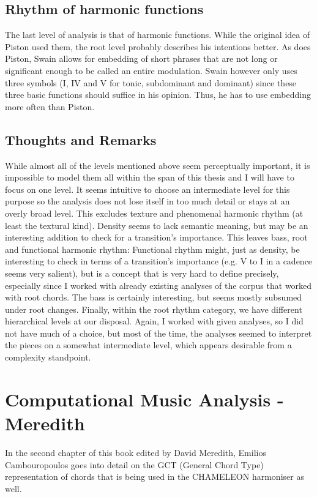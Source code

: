 \documentclass[a4paper,12pt]{report}
\begin{document}
\subsection{Rhythm of harmonic functions}
The last level of analysis is that of harmonic functions. While the original idea of Piston used them, the
root level probably describes his intentions better. As does Piston, Swain allows for embedding of short
phrases that are not long or significant enough to be called an entire modulation. Swain however only
uses three symbols (I, IV and V for tonic, subdominant and dominant) since these three basic functions
should suffice in his opinion. Thus, he has to use embedding more often than Piston.

\subsection{Thoughts and Remarks}
While almost all of the levels mentioned above seem perceptually important, it is impossible to model
them all within the span of this thesis and I will have to focus on one level. It seems intuitive to choose an
intermediate level for this purpose so the analysis does not lose itself in too much detail or stays at an
overly broad level. This excludes texture and phenomenal harmonic rhythm (at least the textural kind).
Density seems to lack semantic meaning, but may be an interesting addition to check for a transition's
importance. This leaves bass, root and functional harmonic rhythm: Functional rhythm might, just as
density, be interesting to check in terms of a transition's importance (e.g. V to I in a cadence seems
very salient), but is a concept that is very hard to define precisely, especially since I worked with already
existing analyses of the corpus that worked with root chords. The bass is certainly interesting, but seems
mostly subsumed under root changes. Finally, within the root rhythm category, we have different
hierarchical levels at our disposal. Again, I worked with given analyses, so I did not have much of a choice,
but most of the time, the analyses seemed to interpret the pieces on a somewhat intermediate level,
which appears desirable from a complexity standpoint.


\section{Computational Music Analysis - Meredith}
\cite{meredith2016computational}
In the second chapter of this book edited by David Meredith, Emilios Cambouropoulos goes into detail on
the GCT (General Chord Type) representation of chords that is being used in the CHAMELEON harmoniser
as well.
\end{document}
